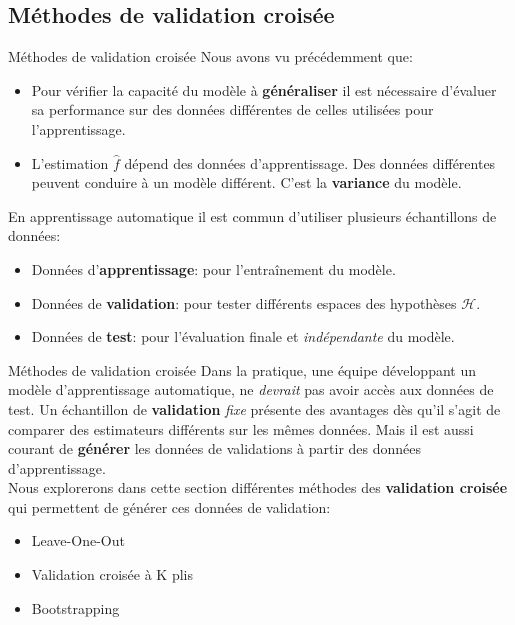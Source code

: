 \documentclass[10pt]{beamer}  %
\begin{document}
\subsection[Méthodes de validation croisée]{Méthodes de validation croisée}

\begin{frame}{Méthodes de validation croisée}
	Nous avons vu précédemment que:
	\begin{itemize}
		\item Pour vérifier la capacité du modèle à \textbf{généraliser} il est nécessaire d'évaluer sa performance sur des données différentes de celles utilisées pour l'apprentissage.
		\item L'estimation $\hat{f}$ dépend des données d'apprentissage. Des données différentes peuvent conduire à un modèle différent. C'est la \textbf{variance} du modèle.
	\end{itemize}
	\pause
	\vspace{0.5cm}
	En apprentissage automatique il est commun d'utiliser plusieurs échantillons de données:
	\begin{itemize}
		\item Données d'\textbf{apprentissage}: pour l'entraînement du modèle.
		\item Données de \textbf{validation}: pour tester différents espaces des hypothèses $\mathcal{H}$.
		\item Données de \textbf{test}: pour l'évaluation finale et \textit{indépendante} du modèle.
	\end{itemize}
\end{frame}

\begin{frame}{Méthodes de validation croisée}
	Dans la pratique, une équipe développant un modèle d'apprentissage automatique, ne \textit{devrait} pas avoir accès aux données de test. Un échantillon de \textbf{validation} \textit{fixe} présente des avantages dès qu'il s'agit de comparer des estimateurs différents sur les mêmes données. Mais il est aussi courant de \textbf{générer} les données de validations à partir des données d'apprentissage. \\
	\pause
	\vspace{0.5cm}
	Nous explorerons dans cette section différentes méthodes des \textbf{validation croisée} qui permettent de générer ces données de validation:
	\begin{itemize}
		\item Leave-One-Out
		\item Validation croisée à K plis
		\item Bootstrapping
	\end{itemize}
\end{frame}
\end{document}
